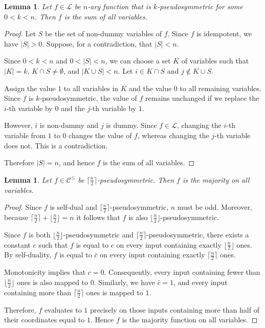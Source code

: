 \documentclass{amsart}
\numberwithin{equation}{section}
\theoremstyle{plain}
\newtheorem{lemma}[theorem]{Lemma}
\theoremstyle{definition}
\def\clone#1{\mathcal{#1}}
\def\Lc{\clone{L}}
\def\Cc{\clone{C}}
\begin{document}
\begin{lemma}
    Let $f\in \Lc$ be $n$-ary function that is $k$-pseudosymmetric for some $0<k<n$. Then $f$ is the sum of all variables.
\end{lemma}
\begin{proof}
    Let $S$ be the set of non-dummy variables of $f$. Since $f$ is idempotent, we have $|S|>0$. Suppose, for a contradiction, that $|S|<n$.
    
    Since $0<k<n$ and $0<|S|<n$, we can choose a set $K$ of variables such that $|K|=k$, $K\cap S\neq \emptyset$, and $|K\cup S| < n$. 
    Let $i\in K\cap S$ and $j\not\in K\cup S$. 
    
    Assign the value $1$ to all variables in $K$ and the value $0$ to all remaining variables. Since $f$ is $k$-pseudosymmetric, the value of $f$ remains unchanged if we replace the $i$-th variable by $0$ and the $j$-th variable by $1$.
    
    However, $i$ is non-dummy and $j$ is dummy. Since $f\in\Lc$, changing the $i$-th variable from $1$ to $0$ changes the value of $f$, whereas changing the $j$-th variable does not. This is a contradiction.

    Therefore $|S|=n$, and hence $f$ is the sum of all variables.
\end{proof}

\begin{lemma}
    Let $f\in \Cc^{\leq}$ be $\lceil{\frac{n}{2}}\rceil$-pseudosymmetric. Then $f$ is the majority on all variables.
\end{lemma}
\begin{proof}
    Since $f$ is self-dual and $\lceil{\frac{n}{2}}\rceil$-pseudosymmetric, $n$ must be odd. Moreover, because $\lceil{\frac{n}{2}}\rceil + \lfloor{\frac{n}{2}}\rfloor = n$ it follows that $f$ is also $\lfloor\frac{n}{2}\rfloor$-pseudosymmetric.

Since $f$ is both $\lfloor\frac{n}{2}\rfloor$-pseudosymmetric and $\lceil\frac{n}{2}\rceil$-pseudosymmetric, there exists a constant $c$ such that $f$ is equal to $c$ on every input containing exactly $\lfloor\frac{n}{2}\rfloor$ ones. By self-duality, $f$ is equal to $\bar c$ on every input containing exactly $\lceil\frac{n}{2}\rceil$ ones.

Monotonicity implies that $c=0$. Consequently, every input containing fewer than $\lfloor\frac{n}{2}\rfloor$ ones is also mapped to $0$. Similarly, we have $\bar c=1$, and every input containing more than $\lceil\frac{n}{2}\rceil$ ones is mapped to $1$. 

Therefore, $f$ evaluates to $1$ precisely on those inputs containing more than half of their coordinates equal to $1$. Hence $f$ is the majority function on all variables.
\end{proof}
\end{document}
